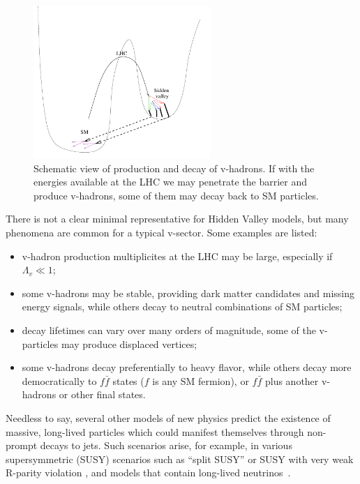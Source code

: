 \begin{figure}[htbp]
\centering
\includegraphics[width=0.6\textwidth]{plots/intro/hiddenvalley.pdf}
\caption{Schematic view of production and decay of v-hadrons. If with the energies
available at the LHC we may penetrate the barrier and produce v-hadrons, some of them may
decay back to SM particles. \label{fig:hv}}
\end{figure}

There is not a clear minimal representative for Hidden Valley models, but
many phenomena are common for a typical v-sector. Some examples are listed:
\begin{itemize}
\item v-hadron production multiplicites at the LHC may be large, especially if $\Lambda_v\ll1$\TeV;
\item some v-hadrons may be stable, providing dark matter candidates and missing energy signals,
while others decay to neutral combinations of SM particles;
\item decay lifetimes can vary over many orders of magnitude, some of the v-particles may produce
displaced vertices;
\item some v-hadrons decay preferentially to heavy flavor, while others decay more democratically
to $f\bar{f}$ states ($f$ is any SM fermion), or $f\bar{f}$ plus another v-hadrons or other final
states.
\end{itemize}




Needless to say, several other models of new physics predict the existence of massive, 
long-lived particles which could
manifest themselves through non-prompt decays to jets. Such scenarios arise, for example,
in various supersymmetric (SUSY) scenarios such as ``split SUSY''
\cite{Hewett:2004nw} or SUSY with very weak R-parity violation \cite{Barbier:2004ez}, and \Zprime models
that contain long-lived neutrinos~\cite{Basso:2008iv}.

